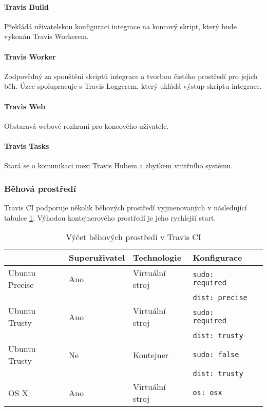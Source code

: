 \paragraph{Travis Build}

Překládá uživatelskou konfiguraci integrace na koncový skript, který bude vykonán Travis Workerem.

\paragraph{Travis Worker}

Zodpovědný za spouštění skriptů integrace a tvorbou čistého prostředí pro jejich běh.
Úzce spolupracuje s Travis Loggerem, který ukládá výstup skriptu integrace.

\paragraph{Travis Web}

Obstaravá webové rozhraní pro koncového uživatele.

\paragraph{Travis Tasks}

Stará se o komunikaci mezi Travis Hubem a zbytkem vnitřního systému.

\subsubsection{Běhová prostředí}

Travis CI podporuje několik běhových prostředí vyjmenovaných v následující tabulce \ref{table:travis-env}.
Výhodou kontejnerového prostředí je jeho rychlejší start.

\begin{table}[ht]
\centering
\caption{Výčet běhových prostředí v Travis CI}
\label{table:travis-env}
\begin{tabular}{|l|l|l|l|l|}
\hline
& Superuživatel & Technologie & Konfigurace  \\ \hline
Ubuntu Precise & Ano & Virtuální stroj & \verb|sudo: required| \\ 
& & & \verb|dist: precise|  \\ \hline
Ubuntu Trusty & Ano & Virtuální stroj & \verb|sudo: required| \\
& & & \verb|dist: trusty| \\ \hline
Ubuntu Trusty & Ne & Kontejner & \verb|sudo: false|  \\
& & & \verb|dist: trusty| \\ \hline
OS X & Ano & Virtuální stroj & \verb|os: osx|  \\ \hline
\end{tabular}
\end{table}


